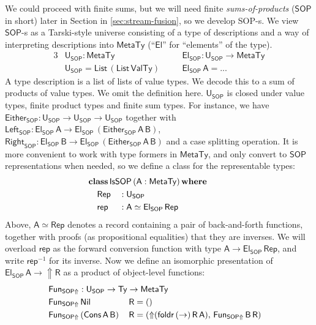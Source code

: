 \documentclass[acmsmall,screen,review,anonymous]{acmart}
\newcommand{\mit}[1]{{\mathsf{#1}}}
\newcommand{\msf}[1]{{\mathsf{#1}}}
\newcommand{\mbf}[1]{{\mathbf{#1}}}
\newcommand{\ind}{\hspace{1em}}
\newcommand{\where}{\mbf{where}}
\newcommand{\vA}{\mathsf{A}}
\newcommand{\vB}{\mathsf{B}}
\newcommand{\vR}{\mathsf{R}}
\newcommand{\SOP}{\msf{SOP}}
\newcommand{\El}{\msf{El}}
\newcommand{\USOP}{\msf{U}_{\msf{SOP}}}
\newcommand{\IsSOP}{\msf{IsSOP}}
\newcommand{\List}{\msf{List}}
\newcommand{\Nil}{\msf{Nil}}
\newcommand{\Cons}{\msf{Cons}}
\newcommand{\Lift}{{\Uparrow}}
\newcommand{\MTy}{\msf{MetaTy}}
\newcommand{\VTy}{\msf{ValTy}}
\newcommand{\Ty}{\msf{Ty}}
\theoremstyle{remark}
\newcommand{\tyclass}{\mbf{class}}
\newcommand{\Either}{\msf{Either}}
\newcommand{\Left}{\msf{Left}}
\newcommand{\Right}{\msf{Right}}
\newcommand{\Rep}{\mit{Rep}}
\begin{document}
We could proceed with finite sums, but we will need finite
\emph{sums-of-products} ($\SOP$ in short) later in Section in \ref{sec:stream-fusion}, so we
develop SOP-s. We view $\SOP$-s as a Tarski-style universe consisting of a type of
descriptions and a way of interpreting descriptions into $\MTy$ (``$\El$'' for
``elements'' of the type).
\begin{alignat*}{3}
  &\USOP : \MTy                    &&\ind \El_\SOP : \USOP \to \MTy \\
  &\USOP = \List\,(\List\,\VTy)    &&\ind \El_\SOP\,\vA = ...
\end{alignat*}
A type description is a list of lists of value types. We decode this to a sum of
products of value types. We omit the definition here. $\USOP$ is closed under
value types, finite product types and finite sum types. For instance, we have
$\Either_\SOP : \USOP \to \USOP \to \USOP$ together with $\Left_\SOP : \El_\SOP\,\vA
\to \El_\SOP\,(\Either_\SOP\,\vA\,\vB)$, $\Right_\SOP : \El_\SOP\,\vB \to
\El_\SOP\,(\Either_\SOP\,\vA\,\vB)$ and a case splitting operation. It is more
convenient to work with type formers in $\MTy$, and only convert to $\SOP$
representations when needed, so we define a class for the representable types:
\begin{alignat*}{3}
  & \hspace{-5em}\mathrlap{\tyclass\,\IsSOP\,(\vA : \MTy)\,\where} \\
  & \hspace{-5em}\ind \Rep      &&: \USOP \\
  & \hspace{-5em}\ind \mit{rep} &&: \vA \simeq \El_\SOP\,\Rep
\end{alignat*}
Above, $\vA \simeq \Rep$ denotes a record containing a pair of back-and-forth
functions, together with proofs (as propositional equalities) that they are
inverses. We will overload $\mit{rep}$ as the forward conversion function with
type $\vA \to \El_\SOP\,\Rep$, and write $\mit{rep}^{-1}$ for its inverse. Now we define
an isomorphic presentation of $\El_\SOP\,\vA \to \Lift \vR$ as a product of
object-level functions:
\begin{alignat*}{3}
  &\mathrlap{\mit{Fun}_{\SOP\Lift} : \USOP \to \Ty \to \MTy}\\
  &\mit{Fun}_{\SOP\Lift}\,\Nil\,&& \vR = ()\\
  &\mit{Fun}_{\SOP\Lift}\,(\Cons\,\vA\,\vB)\,&& \vR = (\Lift(\mit{foldr}\,(\to)\,\vR\,\vA),\,\mit{Fun}_{\SOP\Lift}\,\vB\,\vR)
\end{alignat*}
\end{document}
